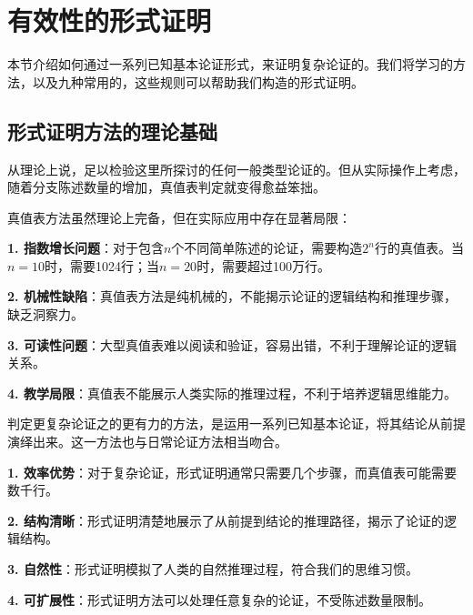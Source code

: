 \section{有效性的形式证明}

\begin{logicbox}[title=引言]
本节介绍如何通过一系列已知基本论证形式，来证明复杂论证的。我们将学习的方法，以及九种常用的，这些规则可以帮助我们构造的形式证明。
\end{logicbox}

\subsection{形式证明方法的理论基础}

从理论上说，足以检验这里所探讨的任何一般类型论证的。但从实际操作上考虑，随着分支陈述数量的增加，真值表判定就变得愈益笨拙。

\begin{theorembox}[title=真值表方法的局限性]
真值表方法虽然理论上完备，但在实际应用中存在显著局限：

\textbf{1. 指数增长问题}：对于包含$n$个不同简单陈述的论证，需要构造$2^n$行的真值表。当$n=10$时，需要1024行；当$n=20$时，需要超过100万行。

\textbf{2. 机械性缺陷}：真值表方法是纯机械的，不能揭示论证的逻辑结构和推理步骤，缺乏洞察力。

\textbf{3. 可读性问题}：大型真值表难以阅读和验证，容易出错，不利于理解论证的逻辑关系。

\textbf{4. 教学局限}：真值表不能展示人类实际的推理过程，不利于培养逻辑思维能力。
\end{theorembox}

判定更复杂论证之的更有力的方法，是运用一系列已知基本论证，将其结论从前提演绎出来。这一方法也与日常论证方法相当吻合。

\begin{examplebox}[title=形式证明的优势]
\textbf{1. 效率优势}：对于复杂论证，形式证明通常只需要几个步骤，而真值表可能需要数千行。

\textbf{2. 结构清晰}：形式证明清楚地展示了从前提到结论的推理路径，揭示了论证的逻辑结构。

\textbf{3. 自然性}：形式证明模拟了人类的自然推理过程，符合我们的思维习惯。

\textbf{4. 可扩展性}：形式证明方法可以处理任意复杂的论证，不受陈述数量限制。
\end{examplebox}

